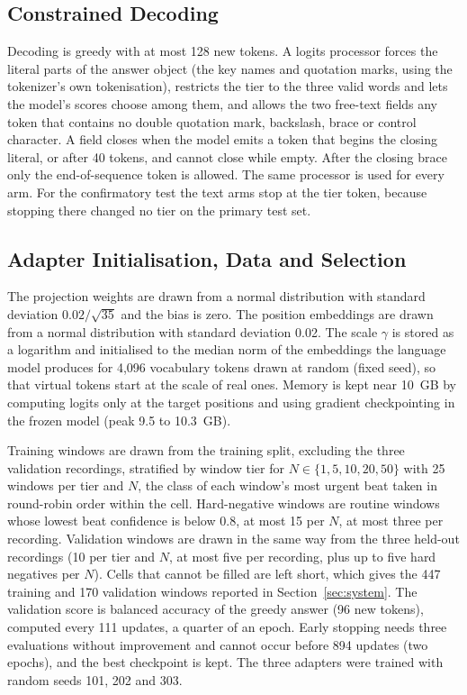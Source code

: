 \subsection{Constrained Decoding}
Decoding is greedy with at most 128 new tokens. A logits processor forces the literal parts of the answer object (the key names and quotation marks, using the tokenizer's own tokenisation), restricts the tier to the three valid words and lets the model's scores choose among them, and allows the two free-text fields any token that contains no double quotation mark, backslash, brace or control character. A field closes when the model emits a token that begins the closing literal, or after 40 tokens, and cannot close while empty. After the closing brace only the end-of-sequence token is allowed. The same processor is used for every arm. For the confirmatory test the text arms stop at the tier token, because stopping there changed no tier on the primary test set.

\subsection{Adapter Initialisation, Data and Selection}
The projection weights are drawn from a normal distribution with standard deviation $0.02/\sqrt{35}$ and the bias is zero. The position embeddings are drawn from a normal distribution with standard deviation 0.02. The scale $\gamma$ is stored as a logarithm and initialised to the median norm of the embeddings the language model produces for 4,096 vocabulary tokens drawn at random (fixed seed), so that virtual tokens start at the scale of real ones. Memory is kept near 10~GB by computing logits only at the target positions and using gradient checkpointing in the frozen model (peak 9.5 to 10.3~GB).

Training windows are drawn from the training split, excluding the three validation recordings, stratified by window tier for $N\in\{1,5,10,20,50\}$ with 25 windows per tier and $N$, the class of each window's most urgent beat taken in round-robin order within the cell. Hard-negative windows are routine windows whose lowest beat confidence is below 0.8, at most 15 per $N$, at most three per recording. Validation windows are drawn in the same way from the three held-out recordings (10 per tier and $N$, at most five per recording, plus up to five hard negatives per $N$). Cells that cannot be filled are left short, which gives the 447 training and 170 validation windows reported in Section~\ref{sec:system}. The validation score is balanced accuracy of the greedy answer (96 new tokens), computed every 111 updates, a quarter of an epoch. Early stopping needs three evaluations without improvement and cannot occur before 894 updates (two epochs), and the best checkpoint is kept. The three adapters were trained with random seeds 101, 202 and 303.

